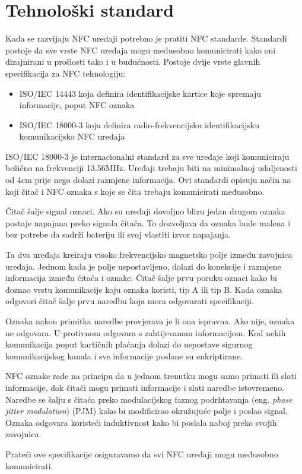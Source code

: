\documentclass[times, utf8, zavrsni]{fer}
\begin{document}
\section{Tehnološki standard}
Kada se razvijaju NFC uređaji potrebno je pratiti NFC standarde. Standardi postoje da sve vrste NFC uređaja mogu međusobno komunicirati kako oni dizajnirani u prošlosti tako i u budućnosti. Postoje dvije vrste glavnih specifikacija za NFC tehnologiju:
\begin{itemize}
\item ISO/IEC 14443 koja definira identifikacijske kartice koje spremaju informacije, poput NFC oznaka
\item ISO/IEC 18000-3 koja definira radio-frekvencijsku identifikacijsku komunikacijsko NFC uređaja
\end{itemize}\par 
ISO/IEC 18000-3 je internacionalni standard za sve uređaje koji komuniciraju bežično na frekvenciji 13.56MHz. Uređaji trebaju biti na minimalnoj udaljenosti od 4cm prije nego dolazi razmjene informacija. Ovi standardi opisuju način na koji čitač i NFC oznaka s koje se čita trebaju komunicirati međusobno.\par
Čitač šalje signal oznaci. Ako su uređaji dovoljno blizu jedan drugom oznaka postaje napajana preko signala čitača. To dozvoljava da oznaka bude malena i bez potrebe da sadrži bateriju ili svoj vlastiti izvor napajanja.\par
Ta dva uređaja kreiraju visoko frekvencijsko magnetsko polje između zavojnica uređaja. Jednom kada je polje uspostavljeno, dolazi do konekcije i razmjene informacija između čitača i oznake. Čitač šalje prvu poruku oznaci kako bi doznao vrstu komunikacije koju oznaka koristi, tip A ili tip B. Kada oznaka odgovori čitač šalje prvu naredbu koja mora odgovarati specifikaciji.\par 
Oznaka nakon primitka naredbe provjerava je li ona ispravna. Ako nije, oznaka ne odgovara. U protivnom odgovara s zahtijevanom informacijom. Kod  nekih komunikacija poput kartičnih plaćanja dolazi do uspostave sigurnog komunikacijskog kanala i sve informacije poslane su enkriptirane.\par 
NFC oznake rade na principu da u jednom trenutku mogu samo primati ili slati informacije, dok čitači mogu primati informacije i slati naredbe istovremeno. Naredbe se šalju s čitaća preko modulacijskog faznog podrhtavanja (eng. \textit{phase jitter modulation}) (PJM) kako bi modificirao okružujuće polje i poslao signal. Oznaka odgovara koristeći induktivnost kako bi poslala naboj preko svojih zavojnica.\par 
Prateći ove specifikacije osiguravamo da svi NFC uređaji mogu međusobno komunicirati.
\end{document}
